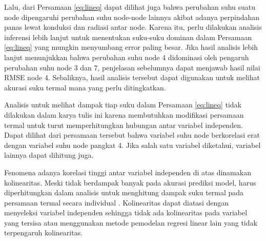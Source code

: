 Lalu, dari Persamaan \ref{eq:lineq} dapat dilihat juga bahwa perubahan suhu
suatu node dipengaruhi perubahan suhu node-node lainnya akibat adanya
perpindahan panas lewat konduksi dan radiasi antar node. Karena itu, perlu
dilakukan analisis inferensi lebih lanjut untuk menentukan suku-suku dominan
dalam Persamaan \ref{eq:lineq} yang mungkin menyumbang error paling besar. Jika
hasil analisis lebih lanjut menunjukkan bahwa perubahan suhu node 4 didominasi
oleh pengaruh perubahan suhu node 3 dan 7, penjelasan sebelumnya dapat menjawab
hasil nilai RMSE node 4. Sebaliknya, hasil analisis tersebut dapat digunakan
untuk melihat akurasi suku termal mana yang perlu ditingkatkan.

Analisis untuk melihat dampak tiap suku dalam Persamaan \ref{eq:lineq} tidak
dilakukan dalam karya tulis ini karena membutuhkan modifikasi persamaan termal
untuk turut memperhitungkan hubungan antar variabel independen. Dapat dilihat
dari persamaan tersebut bahwa variabel suhu node berkorelasi erat dengan
variabel suhu node pangkat 4. Jika salah satu variabel diketahui, variabel
lainnya dapat dihitung juga. 

Fenomena adanya korelasi tinggi antar variabel independen di atas dinamakan
kolinearitas. Meski tidak berdampak banyak pada akurasi prediksi model,
harus diperhitungkan dalam analisis untuk menghitung dampak suku termal pada
persamaan termal secara individual \cite{lieberman2014}\cite{mundfrom2018}.
Kolinearitas dapat diatasi dengan menyeleksi variabel independen sehingga tidak
ada kolinearitas pada variabel yang tersisa atau menggunakan metode pemodelan
regresi linear lain yang tidak terpengaruh kolinearitas.

